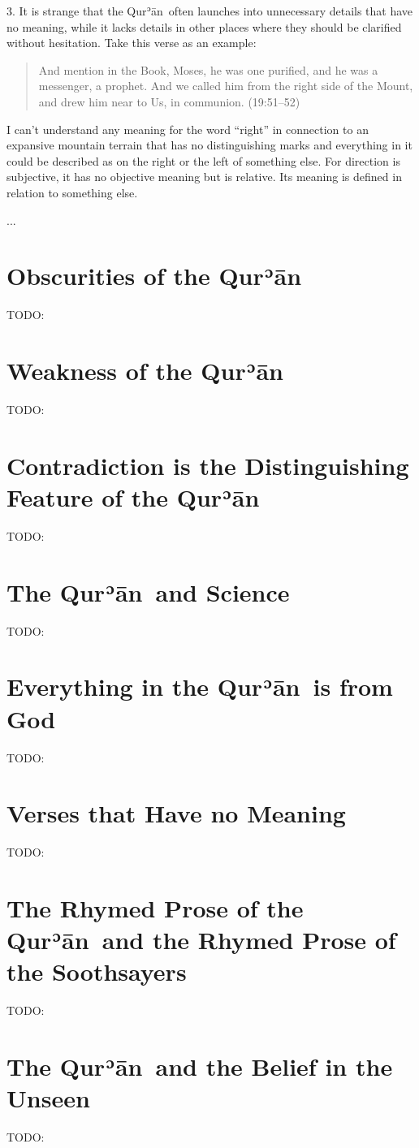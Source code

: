 \documentclass[12pt]{memoir}
\def\´{ʾ} %
\def \Quran{Qur\-\´ān} %
\newcommand{\QRef}[1]{{\color{darkblue}#1}}
\begin{document}
3. It is strange that the \Quran\ often launches
into unnecessary details that have no meaning,
while it lacks details in other places
where they should be clarified without hesitation.
Take this verse as an example:

\begin{quote}
And mention in the Book, Moses, he was one purified, and he was a messenger, a prophet.
And we called him from the right side of the Mount, and drew him near to Us, in communion.
(\QRef{19:51–52})
\end{quote}

I can’t understand any meaning for the word “right” in connection
to an expansive mountain terrain that has no distinguishing marks
and everything in it could be described as on the right or the left
of something else.
For direction is subjective,
it has no objective meaning but is relative.
Its meaning is defined in relation to something else.

...


\section{Obscurities of the \Quran}
TODO:
\section{Weakness of the \Quran}
TODO:
\section{Contradiction is the Distinguishing Feature of the \Quran}
TODO:
\section{The \Quran\ and Science}
TODO:
\section{Everything in the \Quran\ is from God}
TODO:
\section{Verses that Have no Meaning}
TODO:
\section{The Rhymed Prose of the \Quran\ and
the Rhymed Prose of the Soothsayers}
TODO:
\section{The \Quran\ and the Belief in the Unseen}
TODO:
\end{document}
